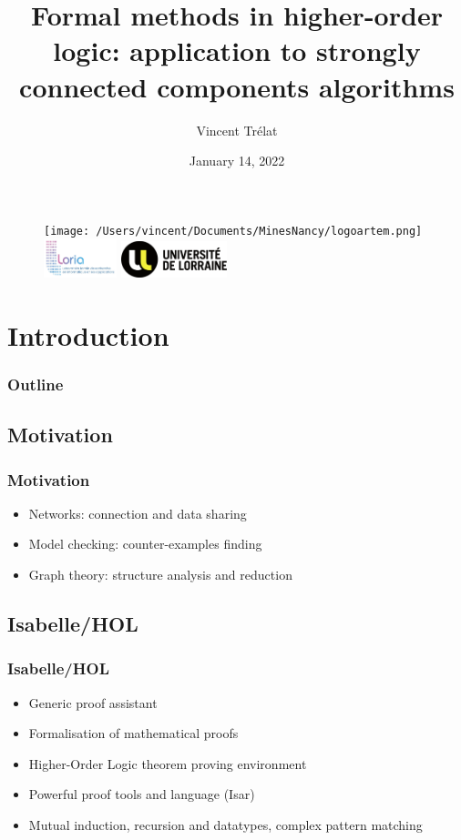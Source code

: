 \documentclass{beamer}
\title[Midterm presentation of the research course]{Formal methods in higher-order logic: application to strongly connected components algorithms}
\date{January 14, 2022}
\author[V. Trélat]{Vincent Trélat}
\institute[Mines Nancy]{\normalsize{École Nationale Supérieure des Mines de Nancy\\Département Informatique}}
\theoremstyle{definition}
\begin{document}
\begin{frame}
  \begin{figure}[t]
    \centering
    \texttt{[image: /Users/vincent/Documents/MinesNancy/logoartem.png]}
    \hspace{1cm}
    \includegraphics[height=32pt]{img/logoloria.jpg}
    \hspace{1cm}
    \includegraphics[height=30pt]{img/logoUL.png}
  \end{figure}
  \titlepage
\end{frame}

\section{Introduction}
\begin{frame}
  \frametitle{Outline}
  \tableofcontents
\end{frame}
\subsection{Motivation}

\begin{frame}
  \frametitle{Motivation}
  \begin{itemize}
    \item Networks: connection and data sharing
    \vfill
    \item Model checking: counter-examples finding
    \vfill
    \item Graph theory: structure analysis and reduction
  \end{itemize}
\end{frame}

\subsection{Isabelle/HOL}
\begin{frame}
  \frametitle{Isabelle/HOL}
  \begin{itemize}
    \item Generic proof assistant
    \vfill
    \item Formalisation of mathematical proofs
    \vfill
    \item Higher-Order Logic theorem proving environment
    \vfill
    \item Powerful proof tools and language (Isar) %
    \vfill
    \item Mutual induction, recursion and datatypes, complex pattern matching
  \end{itemize}
\end{frame}
\end{document}
